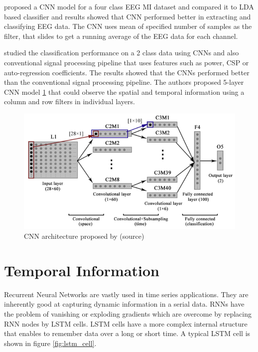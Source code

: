 \cite{2021_Online_EEG_MCNN} proposed a CNN model for a four class EEG MI dataset and compared it to LDA based classifier and results showed that CNN performed better in extracting and classifying EEG data. The CNN uses mean of specified number of samples as the filter, that slides to get a running average of the EEG data for each channel. 

\cite{2017_1trial_MIEEG_DNN} studied the classification performance on a 2 class data using CNNs and also conventional signal processing pipeline that uses features such as power, CSP or auto-regression coefficients. The results showed that the CNNs performed better than the conventional signal processing pipeline. The authors proposed 5-layer CNN model \ref{fig:2017_1trial_MIEEG_DNN_arch} that could observe the spatial and temporal information using a column and row filters in individual layers.

    \begin{figure}[h] 
        \includegraphics[height=0.6\textwidth]{images/2017_1trial_MIEEG_DNN_arch.png}
        \caption{CNN architecture proposed by \cite{2017_1trial_MIEEG_DNN}(source)}
        \label{fig:2017_1trial_MIEEG_DNN_arch}
    \end{figure}
    
\section{Temporal Information}

Recurrent Neural Networks are vastly used in time series applications. They are inherently good at capturing dynamic information in a serial data. RNNs have the problem of vanishing or exploding gradients which are overcome by replacing RNN nodes by LSTM cells. LSTM cells have a more complex internal structure that enables to remember data over a long or short time. A typical LSTM cell is shown in figure \ref{fig:lstm_cell}.

